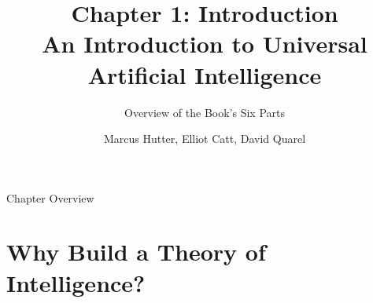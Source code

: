 \documentclass[aspectratio=169,10pt]{beamer}
\title[Ch.\,1 Introduction]{%
  \textbf{Chapter 1: Introduction}\\
  \normalsize An Introduction to Universal Artificial Intelligence}
\subtitle{Overview of the Book's Six Parts}
\author{Marcus Hutter, Elliot Catt, David Quarel}
\institute{Taylor \& Francis / CRC Press, 2024}
\date{}
\begin{document}
\begin{frame}
  \titlepage
\end{frame}

\begin{frame}{Chapter Overview}
  \tableofcontents
\end{frame}


\section{Why Build a Theory of Intelligence?}
\end{document}

